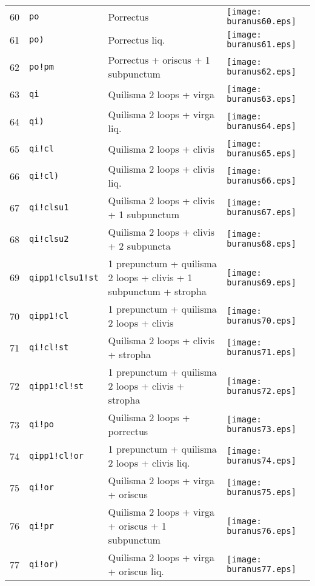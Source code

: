 \documentclass{scrarticle}
\begin{document}
\begin{longtable}{l|l|l|l}
60 & \texttt{po} & Porrectus & \texttt{[image: buranus60.eps]} \\
61 & \texttt{po)} & Porrectus liq. & \texttt{[image: buranus61.eps]} \\
62 & \texttt{po!pm} & Porrectus + oriscus + 1 subpunctum & \texttt{[image: buranus62.eps]} \\
63 & \texttt{qi} & Quilisma 2 loops + virga & \texttt{[image: buranus63.eps]} \\
64 & \texttt{qi)} & Quilisma 2 loops + virga liq. & \texttt{[image: buranus64.eps]} \\
65 & \texttt{qi!cl} & Quilisma 2 loops + clivis & \texttt{[image: buranus65.eps]} \\
66 & \texttt{qi!cl)} & Quilisma 2 loops + clivis liq. & \texttt{[image: buranus66.eps]} \\
67 & \texttt{qi!clsu1} & Quilisma 2 loops + clivis + 1 subpunctum & \texttt{[image: buranus67.eps]} \\
68 & \texttt{qi!clsu2} & Quilisma 2 loops + clivis + 2 subpuncta & \texttt{[image: buranus68.eps]} \\
69 & \texttt{qipp1!clsu1!st} & 1 prepunctum + quilisma 2 loops + clivis + 1 subpunctum + stropha & \texttt{[image: buranus69.eps]} \\
70 & \texttt{qipp1!cl} & 1 prepunctum + quilisma 2 loops + clivis & \texttt{[image: buranus70.eps]} \\
71 & \texttt{qi!cl!st} & Quilisma 2 loops + clivis + stropha & \texttt{[image: buranus71.eps]} \\
72 & \texttt{qipp1!cl!st} & 1 prepunctum + quilisma 2 loops + clivis + stropha & \texttt{[image: buranus72.eps]} \\
73 & \texttt{qi!po} & Quilisma 2 loops + porrectus & \texttt{[image: buranus73.eps]} \\
74 & \texttt{qipp1!cl!or} & 1 prepunctum + quilisma 2 loops + clivis liq. & \texttt{[image: buranus74.eps]} \\
75 & \texttt{qi!or} & Quilisma 2 loops + virga + oriscus & \texttt{[image: buranus75.eps]} \\
76 & \texttt{qi!pr} & Quilisma 2 loops + virga + oriscus + 1 subpunctum & \texttt{[image: buranus76.eps]} \\
77 & \texttt{qi!or)} & Quilisma 2 loops + virga + oriscus liq. & \texttt{[image: buranus77.eps]} \\

\end{longtable}
\end{document}
